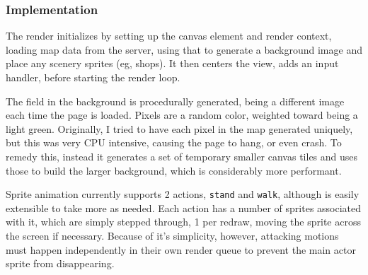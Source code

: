 \documentclass[12pt]{amsart}
\begin{document}
    \subsubsection{Implementation}
      \begin{flushleft}
        The render initializes by setting up the canvas element and render
        context, loading map data from the server, using that to generate a
        background image and place any scenery sprites (eg, shops). It then
        centers the view, adds an input handler, before starting the render
        loop.

        The field in the background is procedurally generated, being a
        different image each time the page is loaded. Pixels are a random
        color, weighted toward being a light green. Originally, I tried to have
        each pixel in the map generated uniquely, but this was very CPU
        intensive, causing the page to hang, or even crash. To remedy this,
        instead it generates a set of temporary smaller canvas tiles and uses
        those to build the larger background, which is considerably more
        performant.

        Sprite animation currently supports 2 actions, \verb/stand/ and
        \verb/walk/, although is easily extensible to take more as needed. Each
        action has a number of sprites associated with it, which are simply
        stepped through, 1 per redraw, moving the sprite across the screen if
        necessary. Because of it's simplicity, however, attacking motions must
        happen independently in their own render queue to prevent the main
        actor sprite from disappearing.
      \end{flushleft}
\end{document}
